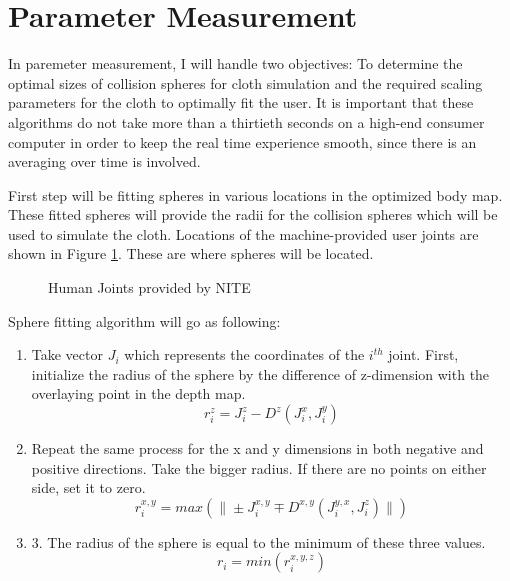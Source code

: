 \section{Parameter Measurement}
In paremeter measurement, I will handle two objectives: To determine the optimal
sizes of collision spheres for cloth simulation and the required scaling parameters for the cloth to optimally fit the user. It is important that these algorithms do not take more than a thirtieth seconds on a high-end consumer computer in order to keep the real time experience smooth, since there is an averaging over time is involved.

First step will be fitting spheres in various locations in the optimized body
map. These fitted spheres will provide the radii for the collision spheres which
will be used to simulate the cloth. Locations of the machine-provided user
joints are shown in Figure \ref{fig:nite_joints}. These are where spheres will
be located.

\begin{figure}[h]
\centerline{}
\caption{Human Joints provided by NITE }
\label{fig:nite_joints}
\end{figure}

Sphere fitting algorithm will go as following:
\begin{enumerate}
\item Take vector $J_i$ which represents the coordinates of the $i^{th}$
joint.
First, initialize the radius of the sphere by the difference of z-dimension with the overlaying point in the depth map.
\begin{equation}
r_i^z=J_i^z-D^z(J_i^x,J_i^y)
\label{eqn:z_sphere_radius}
\end{equation}
\item Repeat the same process for the x and y dimensions in both negative and positive directions. Take the bigger radius. If there are no points on either side, set it to zero.
\begin{equation}
r_i^{x,y}=max(\| \pm J_i^{x,y} \mp D^{x,y}(J_i^{y,x},J_i^z)\|)
\label{eqn:x_y_sphere_radius}
\end{equation}
\item 3. The radius of the sphere is equal to the minimum of these three values.
\begin{equation}
r_i=min(r_i^{x,y,z})
\label{eqn:minimum_sphere-radius}
\end{equation}
\end{enumerate}

